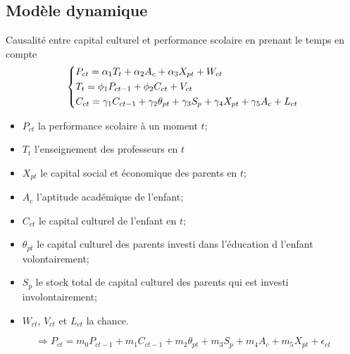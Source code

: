 \documentclass[9pt]{beamer}
\begin{document}
\subsection{Modèle dynamique}
\begin{frame}
	\begin{block}{Causalité entre capital culturel et performance scolaire en prenant le temps en compte}
		\begin{align}
		\begin{dcases}
		P_{ct}=\alpha_1T_t+\alpha_2A_c+\alpha_3X_{pt}+W_{ct}\\
		T_t = \phi_1P_{ct-1}+\phi_2C_{ct}+V_{ct}\\
		C_{ct}=\gamma_1C_{ct-1}+\gamma_2\theta_{pt}+\gamma_3S_p+\gamma_4X_{pt}+\gamma_5A_c+L_{ct}
		\end{dcases}
		\end{align}
		\begin{itemize}
		 \item $P_{ct}$ la performance scolaire à un moment $t$;
		 \item $T_t$ l'enseignement des professeurs en $t$
		\item $X_{pt}$ le capital social et économique des parents en $t$;
 		\item $A_c$ l'aptitude académique de l'enfant;
		\item $C_{ct}$ le capital culturel de l'enfant en $t$;
 		\item $\theta_{pt}$ le capital culturel des parents investi dans l'éducation d l'enfant volontairement;
 		\item $S_p$ le stock total de capital culturel des parents qui est investi involontairement;
 		\item $W_{ct}$, $V_{ct}$ et $L_{ct}$ la chance.\\
		\end{itemize}
		
		\begin{equation}
		\Rightarrow P_{ct} = m_0P_{ct-1}+m_1C_{ct-1}+m_2\theta_{pt}+m_3S_p+m_4A_c+m_5X_{pt}+\epsilon_{ct}
		\end{equation}
	\end{block}
\end{frame}
\end{document}
